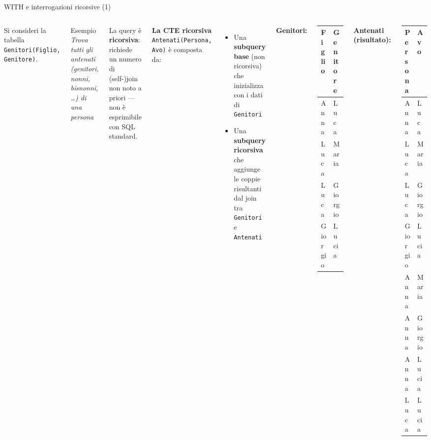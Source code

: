 \documentclass[aspectratio=169]{beamer}
\begin{document}
\begin{frame}[fragile]{WITH e interrogazioni ricorsive (1)}

\begin{columns}[T]
Si consideri la tabella \texttt{Genitori(Figlio, Genitore)}.

\begin{block}{Esempio}
\textit{Trova tutti gli antenati (genitori, nonni, bisnonni, \ldots) di una persona}
\end{block}

La query è \textbf{ricorsiva}: richiede un numero di (self-)join non noto a priori — non è esprimibile con SQL standard.

\vspace{6pt}
\textbf{La CTE ricorsiva} \texttt{Antenati(Persona, Avo)} è composta da:
\begin{itemize}
  \item Una \textbf{subquery base} (non ricorsiva) che inizializza con i dati di \texttt{Genitori}
  \item Una \textbf{subquery ricorsiva} che aggiunge le coppie risultanti dal join tra \texttt{Genitori} e \texttt{Antenati}
\end{itemize}

\textbf{Genitori:}\\[4pt]
\small
\begin{tabular}{|l|l|}
\hline
\textbf{Figlio} & \textbf{Genitore}\\
\hline
Anna    & Luca   \\
Luca    & Maria  \\
Luca    & Giorgio\\
Giorgio & Lucia  \\
\hline
\end{tabular}

\vspace{10pt}
\textbf{Antenati (risultato):}\\[4pt]
\small
\begin{tabular}{|l|l|}
\hline
\textbf{Persona} & \textbf{Avo}\\
\hline
Anna & Luca    \\
Luca & Maria   \\
Luca & Giorgio \\
Giorgio & Lucia \\
Anna & Maria   \\
Anna & Giorgio \\
Anna & Lucia   \\
Luca & Lucia   \\
\hline
\end{tabular}
\end{columns}

\end{frame}
\end{document}
